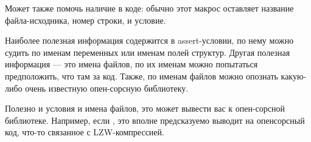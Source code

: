 Может также помочь наличие  в коде: обычно этот макрос оставляет название файла-исходника, 
номер строки, и условие.

Наиболее полезная информация содержится в assert-условии, по нему можно судить по именам переменных
или именам полей структур. Другая полезная информация --- это имена файлов, по их именам можно попытаться
предположить, что там за код. Также, по именам файлов можно опознать какую-либо очень известную опен-сорсную
библиотеку.



Полезно  и условия и имена файлов, это может вывести вас к опен-сорсной библиотеке.
Например, если  , 
это вполне предсказуемо выводит на опенсорсный код, что-то связанное с LZW-компрессией.

